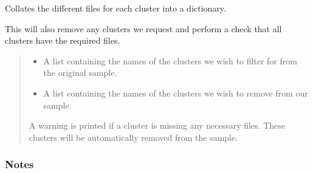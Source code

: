 \documentclass[letterpaper,12pt,english]{sphinxmanual}
\begin{document}
\begin{fulllineitems}
\begin{fulllineitems}
\label{\detokenize{api/selector:SPTclIRAGN.Pipeline_functions.SelectIRAGN.file_pairing}}
\pysigstartsignatures
{}
\pysigstopsignatures
\sphinxAtStartPar
Collates the different files for each cluster into a dictionary.

\sphinxAtStartPar
This will also remove any clusters we request and perform a check that all clusters have the required files.
\begin{quote}\begin{description}
\begin{itemize}
\item {} 
\sphinxAtStartPar
{} \textendash{} A list containing the names of the clusters we wish to filter for from the original sample.

\item {} 
\sphinxAtStartPar
{} \textendash{} A list containing the names of the clusters we wish to remove from our sample.

\end{itemize}

\sphinxAtStartPar
{} \textendash{} A warning is printed if a cluster is missing any necessary files. These clusters will be automatically
    removed from the sample.

\end{description}\end{quote}
\subsubsection*{Notes}


\end{fulllineitems}
\end{fulllineitems}
\end{document}
